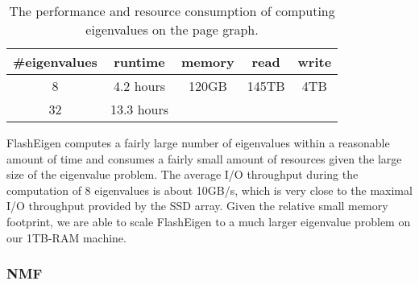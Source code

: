 \begin{table}
	\begin{center}
		\small
		\begin{tabular}{|c|c|c|c|c|}
			\hline
			\#eigenvalues & runtime & memory & read & write \\
			\hline
			8 & 4.2 hours & 120GB & 145TB & 4TB \\
			\hline
			32 & 13.3 hours &  &  & \\
			\hline
		\end{tabular}
		\normalsize
	\end{center}
	\caption{The performance and resource consumption of computing eigenvalues
	on the page graph.}
	\label{pg_ev}
\end{table}

FlashEigen computes a fairly large number of eigenvalues within a reasonable
amount of time and consumes a fairly small amount of resources given the large
size of the eigenvalue problem.
The average I/O throughput during the computation of 8 eigenvalues is about
10GB/s, which is very close to the maximal I/O throughput provided by
the SSD array.
Given the relative small memory footprint, we are able to scale FlashEigen
to a much larger eigenvalue problem on our 1TB-RAM machine.

\subsubsection{NMF}

